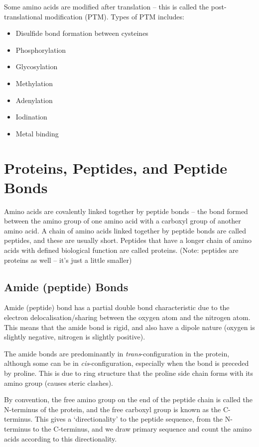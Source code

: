 Some amino acids are modified after translation -- this is called the post-translational modification (PTM).
Types of PTM includes:
\begin{itemize}
    \item Disulfide bond formation between cysteines
    \item Phosphorylation
    \item Glycosylation
    \item Methylation
    \item Adenylation
    \item Iodination
    \item Metal binding
\end{itemize}

\section{Proteins, Peptides, and Peptide Bonds}

Amino acids are covalently linked together by peptide bonds -- the bond formed between the amino group of one amino acid with a carboxyl group of another amino acid.
A chain of amino acids linked together by peptide bonds are called peptides, and these are usually short.
Peptides that have a longer chain of amino acids with defined biological function are called proteins.
(Note: peptides are proteins as well -- it's just a little smaller)

\subsection{Amide (peptide) Bonds}

Amide (peptide) bond has a partial double bond characteristic due to the electron delocalisation/sharing between the oxygen atom and the nitrogen atom.
This means that the amide bond is rigid, and also have a dipole nature (oxygen is slightly negative, nitrogen is slightly positive).

The amide bonds are predominantly in \textit{trans}-configuration in the protein, although some can be in \textit{cis}-configuration, especially when the bond is preceded by proline.
This is due to ring structure that the proline side chain forms with its amino group (causes steric clashes).

By convention, the free amino group on the end of the peptide chain is called the N-terminus of the protein, and the free carboxyl group is known as the C-terminus.
This gives a `directionality' to the peptide sequence, from the N-terminus to the C-terminus, and we draw primary sequence and count the amino acids according to this directionality.
